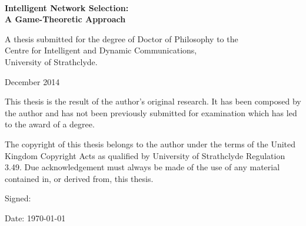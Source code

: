 \begin{titlepage}

\vspace*{2.2cm}

\\[1ex]
{\bf\sffamily\Huge Intelligent Network Selection:}\\[1ex]
{\bf\sffamily\Huge A Game-Theoretic Approach}

\par
\vspace{2cm}


\par
\vspace{6.5cm}

\noindent A thesis submitted for the degree of Doctor of Philosophy to the \\Centre for Intelligent and Dynamic Communications,\\ University of Strathclyde.

\par
\vspace{1cm}

\noindent December 2014

\cleardoublepage


\vspace*{2.2cm}

\noindent This thesis is the result of the author's original research. It has been composed by the author and has not been previously submitted for examination which has led to the award of a degree.

\par
\vspace{1em}

\noindent The copyright of this thesis belongs to the author under the terms of the United Kingdom Copyright Acts as qualified by University of Strathclyde Regulation 3.49. Due acknowledgement must always be made of the use of any material contained in, or derived from, this thesis.

\par
\vspace{1em}

\noindent Signed:

\par
\vspace{1em}

\noindent Date: \today

\cleardoublepage
\end{titlepage}